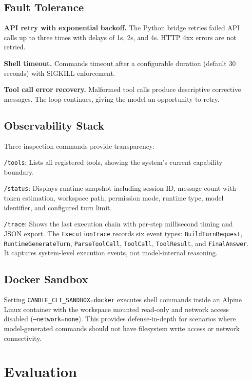 \documentclass[11pt]{article}
\begin{document}
\subsection{Fault Tolerance}

\textbf{API retry with exponential backoff.} The Python bridge retries failed API calls up to three times with delays of 1s, 2s, and 4s. HTTP 4xx errors are not retried.

\textbf{Shell timeout.} Commands timeout after a configurable duration (default 30 seconds) with SIGKILL enforcement.

\textbf{Tool call error recovery.} Malformed tool calls produce descriptive corrective messages. The loop continues, giving the model an opportunity to retry.

\subsection{Observability Stack}

Three inspection commands provide transparency:

\texttt{/tools}: Lists all registered tools, showing the system's current capability boundary.

\texttt{/status}: Displays runtime snapshot including session ID, message count with token estimation, workspace path, permission mode, runtime type, model identifier, and configured turn limit.

\texttt{/trace}: Shows the last execution chain with per-step millisecond timing and JSON export. The \texttt{ExecutionTrace} records six event types: \texttt{BuildTurnRequest}, \texttt{RuntimeGenerateTurn}, \texttt{ParseToolCall}, \texttt{ToolCall}, \texttt{ToolResult}, and \texttt{FinalAnswer}. It captures system-level execution events, not model-internal reasoning.

\subsection{Docker Sandbox}

Setting \texttt{CANDLE\_CLI\_SANDBOX=docker} executes shell commands inside an Alpine Linux container with the workspace mounted read-only and network access disabled (\texttt{--network=none}). This provides defense-in-depth for scenarios where model-generated commands should not have filesystem write access or network connectivity.

\section{Evaluation}
\label{sec:evaluation}
\end{document}
